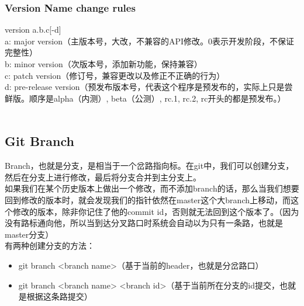 \documentclass{article}
\begin{document}
\subsubsection{Version Name change rules}
version a.b.c[-d]\\
a: major version（主版本号，大改，不兼容的API修改。0表示开发阶段，不保证完整性）\\
b: minor version（次版本号，添加新功能，保持兼容）\\
c: patch version（修订号，兼容更改以及修正不正确的行为）\\
d: pre-release version（预发布版本号，代表这个程序是预发布的，实际上只是尝鲜版。顺序是alpha（内测）, beta（公测）, rc.1, rc.2, rc开头的都是预发布。）\\
\\
\subsection{Git Branch}
Branch，也就是分支，是相当于一个岔路指向标。在git中，我们可以创建分支，然后在分支上进行修改，最后将分支合并到主分支上。\\
如果我们在某个历史版本上做出一个修改，而不添加branch的话，那么当我们想要回到修改的版本时，就会发现我们的指针依然在master这个大branch上移动，而这个修改的版本，除非你记住了他的commit id，否则就无法回到这个版本了。（因为没有路标通向他，所以当到达分叉路口时系统会自动以为只有一条路，也就是master分支）\\
有两种创建分支的方法：\\
\begin{itemize}
    \item git branch <branch name>（基于当前的header，也就是分岔路口）
    \item git branch <branch name> <branch id>（基于当前所在分支的id提交，也就是根据这条路提交）
\end{itemize}
\end{document}
